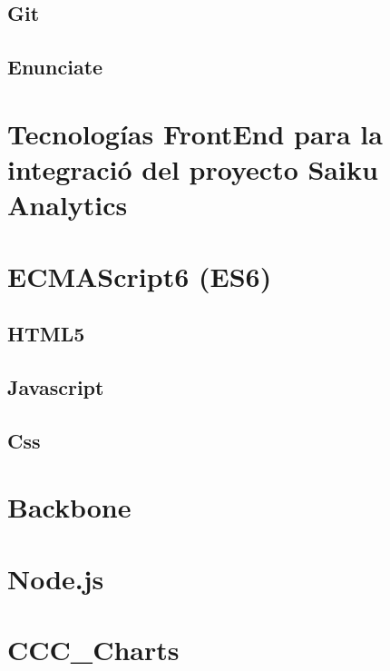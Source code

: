 	\subsection{Git}
	\subsection{Enunciate}
\section{Tecnolog\'{i}as FrontEnd para la integraci\'{o} del proyecto Saiku Analytics}
	\section{ECMAScript6 (ES6)}
	\subsection{HTML5}
	\subsection{Javascript}
	\subsection{Css}
	\section{Backbone}
	\section{Node.js}
	\section{CCC_Charts}

		
		
		
		
